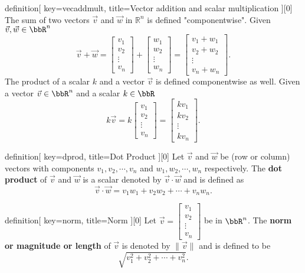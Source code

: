\begin{SaveConcept}{definition}[
		key=vecaddmult,
		title={Vector addition and scalar multiplication}
	][0]
The sum of two vectors $\vec v$ and $\vec w$ in $\mathbb{R}^n$ is defined "componentwise". Given $\vec v, \vec w\in \bbR^n$
$$
\vec v+\vec w=\begin{bmatrix}
	v_1\\v_2\\\vdots\\v_n
\end{bmatrix}+\begin{bmatrix}
w_1\\w_2\\\vdots\\w_n
\end{bmatrix}=\begin{bmatrix}
v_1+w_1\\v_2+w_2\\\vdots\\v_n+w_n
\end{bmatrix}.
$$
The product of a scalar $k$ and a vector $\vec v$ is defined componentwise as well. Given a vector $\vec v\in \bbR^n$ and a scalar $k\in \bbR$ 
$$
k\vec v=k \begin{bmatrix}
	v_1\\v_2\\\vdots\\v_n
\end{bmatrix}=\begin{bmatrix}
kv_1\\kv_2\\\vdots\\kv_n
\end{bmatrix}.
$$  
\end{SaveConcept}












\begin{SaveConcept}{definition}[
		key=dprod,
		title={Dot Product}
	][0]
        Let $\vec v$ and $\vec w$ be (row or column) vectors with components $v_1,v_2,\cdots,v_n$ and $w_1,w_2,\cdots,w_n$ respectively. The \textbf{dot product} of $\vec v$ and $\vec w$ is a scalar denoted by $\vec v\cdot\vec w$ and is defined as
	$$
	\vec v\cdot\vec w=v_1w_1+v_2w_2+\cdots+v_nw_n.
	$$
\end{SaveConcept}


\begin{SaveConcept}{definition}[
		key=norm,
		title={Norm}
	][0]
        Let $\vec v=\begin{bmatrix} v_1\\v_2\\\vdots\\v_n \end{bmatrix}$ be in $\bbR^n$. The \textbf{norm or magnitude or length} of $\vec v$ is denoted by $\|\vec v\|$ and is defined to be
	$$
	\sqrt{v_1^2+v_2^2+\cdots+v_n^2}.
	$$
\end{SaveConcept}


